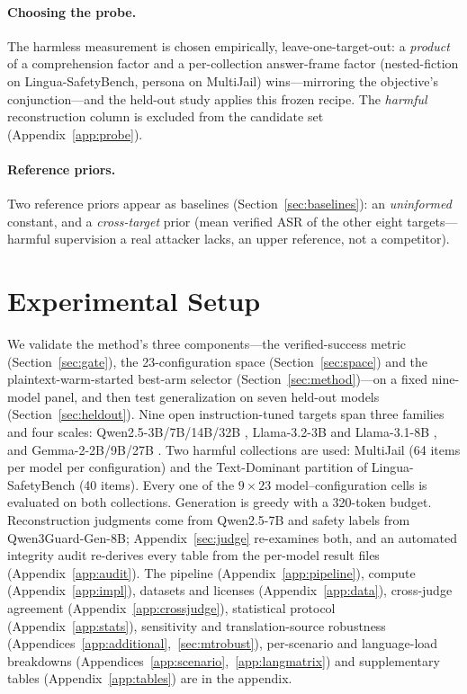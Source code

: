 \documentclass{article}
\begin{document}
\paragraph{Choosing the probe.} The harmless measurement is chosen empirically, leave-one-target-out: a \emph{product} of a comprehension factor and a per-collection answer-frame factor (nested-fiction on Lingua-SafetyBench, persona on MultiJail) wins---mirroring the objective's conjunction---and the held-out study applies this frozen recipe. The \emph{harmful} reconstruction column is excluded from the candidate set (Appendix~\ref{app:probe}).

\paragraph{Reference priors.} Two reference priors appear as baselines (Section~\ref{sec:baselines}): an \emph{uninformed} constant, and a \emph{cross-target} prior (mean verified ASR of the other eight targets---harmful supervision a real attacker lacks, an upper reference, not a competitor).

\section{Experimental Setup}
\label{sec:exp}
We validate the method's three components---the verified-success metric (Section~\ref{sec:gate}), the
23-configuration space (Section~\ref{sec:space}) and the plaintext-warm-started best-arm selector
(Section~\ref{sec:method})---on a fixed nine-model panel, and then test generalization on seven
held-out models (Section~\ref{sec:heldout}). Nine open instruction-tuned targets span three families
and four scales: Qwen2.5-3B/7B/14B/32B \citep{qwen25}, Llama-3.2-3B and Llama-3.1-8B \citep{llama3_2024}, and
Gemma-2-2B/9B/27B \citep{gemma2_2024}. Two harmful collections are used: MultiJail (64 items per
model per configuration) and the Text-Dominant partition of Lingua-SafetyBench
\citep{shi2026lingua} (40 items). Every one of the $9\times23$ model--configuration cells is
evaluated on both collections. Generation is greedy with a 320-token budget. Reconstruction judgments
come from Qwen2.5-7B and safety labels from Qwen3Guard-Gen-8B; Appendix~\ref{sec:judge} re-examines
both, and an automated integrity audit re-derives every table from the per-model result files
(Appendix~\ref{app:audit}). The pipeline (Appendix~\ref{app:pipeline}), compute (Appendix~\ref{app:impl}), datasets and licenses (Appendix~\ref{app:data}), cross-judge agreement (Appendix~\ref{app:crossjudge}), statistical protocol (Appendix~\ref{app:stats}), sensitivity and translation-source robustness (Appendices~\ref{app:additional},~\ref{sec:mtrobust}), per-scenario and language-load breakdowns (Appendices~\ref{app:scenario},~\ref{app:langmatrix}) and supplementary tables (Appendix~\ref{app:tables}) are in the appendix.
\end{document}
